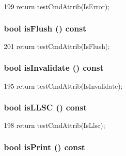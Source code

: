 \begin{DoxyCode}
199 { return testCmdAttrib(IsError); }
\end{DoxyCode}
\hypertarget{classMemCmd_a5e6baaa42eabbb07af2d1769e3c0499b}{
\subsubsection[{isFlush}]{\setlength{\rightskip}{0pt plus 5cm}bool isFlush () const}}
\label{classMemCmd_a5e6baaa42eabbb07af2d1769e3c0499b}



\begin{DoxyCode}
201 { return testCmdAttrib(IsFlush); }
\end{DoxyCode}
\hypertarget{classMemCmd_a4a1a39b8ffab2d6266cd9d794ca332e3}{
\subsubsection[{isInvalidate}]{\setlength{\rightskip}{0pt plus 5cm}bool isInvalidate () const}}
\label{classMemCmd_a4a1a39b8ffab2d6266cd9d794ca332e3}



\begin{DoxyCode}
195 { return testCmdAttrib(IsInvalidate); }
\end{DoxyCode}
\hypertarget{classMemCmd_a8965874e960faf91ad4b6af8dbf31875}{
\subsubsection[{isLLSC}]{\setlength{\rightskip}{0pt plus 5cm}bool isLLSC () const}}
\label{classMemCmd_a8965874e960faf91ad4b6af8dbf31875}



\begin{DoxyCode}
198 { return testCmdAttrib(IsLlsc); }
\end{DoxyCode}
\hypertarget{classMemCmd_ae56bb417ddf53e85cb389267590fe969}{
\subsubsection[{isPrint}]{\setlength{\rightskip}{0pt plus 5cm}bool isPrint () const}}
\label{classMemCmd_ae56bb417ddf53e85cb389267590fe969}



